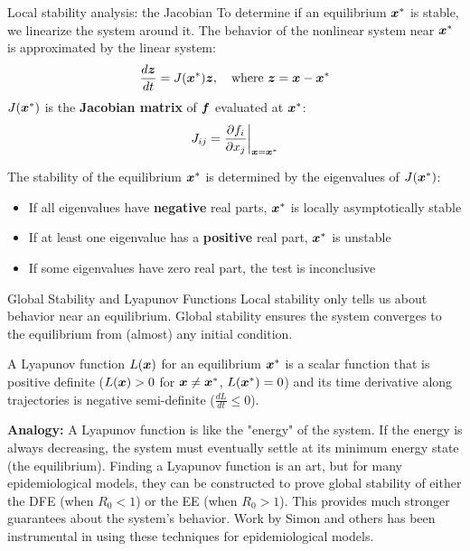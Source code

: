 \documentclass[aspectratio=169]{beamer}\usepackage[]{graphicx}\usepackage[]{xcolor}
\begin{document}
\begin{frame}{Local stability analysis: the Jacobian}
    To determine if an equilibrium $\bm{x}^*$ is stable, we linearize the system around it.
    The behavior of the nonlinear system near $\bm{x}^*$ is approximated by the linear system:
    $$ \frac{d\bm{z}}{dt} = J(\bm{x}^*) \bm{z}, \quad \text{where } \bm{z} = \bm{x} - \bm{x}^* $$
    $J(\bm{x}^*)$ is the \textbf{Jacobian matrix} of $\bm{f}$ evaluated at $\bm{x}^*$:
    $$ J_{ij} = \frac{\partial f_i}{\partial x_j} \bigg|_{\bm{x}=\bm{x}^*} $$
    \begin{theorem}
        The stability of the equilibrium $\bm{x}^*$ is determined by the eigenvalues of $J(\bm{x}^*)$:
        \begin{itemize}
            \item If all eigenvalues have \textbf{negative} real parts, $\bm{x}^*$ is locally asymptotically stable
            \item If at least one eigenvalue has a \textbf{positive} real part, $\bm{x}^*$ is unstable
            \item If some eigenvalues have zero real part, the test is inconclusive
        \end{itemize}
    \end{theorem}
\end{frame}

\begin{frame}{Global Stability and Lyapunov Functions}
    Local stability only tells us about behavior near an equilibrium. Global stability ensures the system converges to the equilibrium from (almost) any initial condition.
    \begin{definition}
        A Lyapunov function $L(\bm{x})$ for an equilibrium $\bm{x}^*$ is a scalar function that is positive definite ($L(\bm{x})>0$ for $\bm{x}\neq\bm{x}^*$, $L(\bm{x}^*)=0$) and its time derivative along trajectories is negative semi-definite ($\frac{dL}{dt} \le 0$).
    \end{definition}
    \textbf{Analogy:} A Lyapunov function is like the "energy" of the system. If the energy is always decreasing, the system must eventually settle at its minimum energy state (the equilibrium).
    \vfill
    Finding a Lyapunov function is an art, but for many epidemiological models, they can be constructed to prove global stability of either the DFE (when $R_0 < 1$) or the EE (when $R_0 > 1$). This provides much stronger guarantees about the system's behavior.
    \vfill
    \small{Work by Simon and others has been instrumental in using these techniques for epidemiological models.}
\end{frame}
\end{document}
